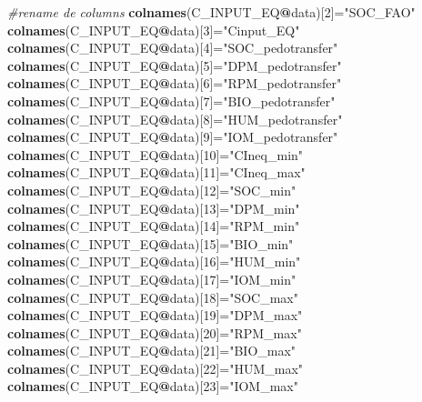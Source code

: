 \documentclass[
  10pt,
  b5paper,
]{book}
\newenvironment{Shaded}{\begin{snugshade}}{\end{snugshade}}
\newcommand{\CommentTok}[1]{\textcolor[rgb]{0.56,0.35,0.01}{\textit{#1}}}
\newcommand{\DecValTok}[1]{\textcolor[rgb]{0.00,0.00,0.81}{#1}}
\newcommand{\KeywordTok}[1]{\textcolor[rgb]{0.13,0.29,0.53}{\textbf{#1}}}
\newcommand{\NormalTok}[1]{#1}
\newcommand{\OperatorTok}[1]{\textcolor[rgb]{0.81,0.36,0.00}{\textbf{#1}}}
\newcommand{\StringTok}[1]{\textcolor[rgb]{0.31,0.60,0.02}{#1}}
\begin{document}
\begin{Shaded}
\begin{Highlighting}[]
\CommentTok{#rename de columns}
\KeywordTok{colnames}\NormalTok{(C_INPUT_EQ}\OperatorTok{@}\NormalTok{data)[}\DecValTok{2}\NormalTok{]=}\StringTok{"SOC_FAO"}
\KeywordTok{colnames}\NormalTok{(C_INPUT_EQ}\OperatorTok{@}\NormalTok{data)[}\DecValTok{3}\NormalTok{]=}\StringTok{"Cinput_EQ"}
\KeywordTok{colnames}\NormalTok{(C_INPUT_EQ}\OperatorTok{@}\NormalTok{data)[}\DecValTok{4}\NormalTok{]=}\StringTok{"SOC_pedotransfer"}
\KeywordTok{colnames}\NormalTok{(C_INPUT_EQ}\OperatorTok{@}\NormalTok{data)[}\DecValTok{5}\NormalTok{]=}\StringTok{"DPM_pedotransfer"}
\KeywordTok{colnames}\NormalTok{(C_INPUT_EQ}\OperatorTok{@}\NormalTok{data)[}\DecValTok{6}\NormalTok{]=}\StringTok{"RPM_pedotransfer"}
\KeywordTok{colnames}\NormalTok{(C_INPUT_EQ}\OperatorTok{@}\NormalTok{data)[}\DecValTok{7}\NormalTok{]=}\StringTok{"BIO_pedotransfer"}
\KeywordTok{colnames}\NormalTok{(C_INPUT_EQ}\OperatorTok{@}\NormalTok{data)[}\DecValTok{8}\NormalTok{]=}\StringTok{"HUM_pedotransfer"}
\KeywordTok{colnames}\NormalTok{(C_INPUT_EQ}\OperatorTok{@}\NormalTok{data)[}\DecValTok{9}\NormalTok{]=}\StringTok{"IOM_pedotransfer"}
\KeywordTok{colnames}\NormalTok{(C_INPUT_EQ}\OperatorTok{@}\NormalTok{data)[}\DecValTok{10}\NormalTok{]=}\StringTok{"CIneq_min"}
\KeywordTok{colnames}\NormalTok{(C_INPUT_EQ}\OperatorTok{@}\NormalTok{data)[}\DecValTok{11}\NormalTok{]=}\StringTok{"CIneq_max"}
\KeywordTok{colnames}\NormalTok{(C_INPUT_EQ}\OperatorTok{@}\NormalTok{data)[}\DecValTok{12}\NormalTok{]=}\StringTok{"SOC_min"}
\KeywordTok{colnames}\NormalTok{(C_INPUT_EQ}\OperatorTok{@}\NormalTok{data)[}\DecValTok{13}\NormalTok{]=}\StringTok{"DPM_min"}
\KeywordTok{colnames}\NormalTok{(C_INPUT_EQ}\OperatorTok{@}\NormalTok{data)[}\DecValTok{14}\NormalTok{]=}\StringTok{"RPM_min"}
\KeywordTok{colnames}\NormalTok{(C_INPUT_EQ}\OperatorTok{@}\NormalTok{data)[}\DecValTok{15}\NormalTok{]=}\StringTok{"BIO_min"}
\KeywordTok{colnames}\NormalTok{(C_INPUT_EQ}\OperatorTok{@}\NormalTok{data)[}\DecValTok{16}\NormalTok{]=}\StringTok{"HUM_min"}
\KeywordTok{colnames}\NormalTok{(C_INPUT_EQ}\OperatorTok{@}\NormalTok{data)[}\DecValTok{17}\NormalTok{]=}\StringTok{"IOM_min"}
\KeywordTok{colnames}\NormalTok{(C_INPUT_EQ}\OperatorTok{@}\NormalTok{data)[}\DecValTok{18}\NormalTok{]=}\StringTok{"SOC_max"}
\KeywordTok{colnames}\NormalTok{(C_INPUT_EQ}\OperatorTok{@}\NormalTok{data)[}\DecValTok{19}\NormalTok{]=}\StringTok{"DPM_max"}
\KeywordTok{colnames}\NormalTok{(C_INPUT_EQ}\OperatorTok{@}\NormalTok{data)[}\DecValTok{20}\NormalTok{]=}\StringTok{"RPM_max"}
\KeywordTok{colnames}\NormalTok{(C_INPUT_EQ}\OperatorTok{@}\NormalTok{data)[}\DecValTok{21}\NormalTok{]=}\StringTok{"BIO_max"}
\KeywordTok{colnames}\NormalTok{(C_INPUT_EQ}\OperatorTok{@}\NormalTok{data)[}\DecValTok{22}\NormalTok{]=}\StringTok{"HUM_max"}
\KeywordTok{colnames}\NormalTok{(C_INPUT_EQ}\OperatorTok{@}\NormalTok{data)[}\DecValTok{23}\NormalTok{]=}\StringTok{"IOM_max"}
\end{Highlighting}
\end{Shaded}
\end{document}
